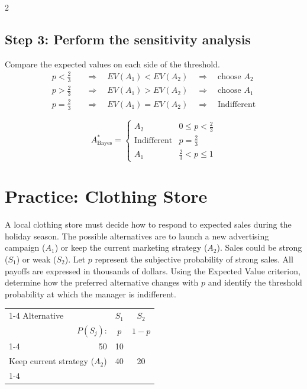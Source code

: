 \begin{multicols}{2}
	\subsection*{Step 3: Perform the sensitivity analysis}
	
	Compare the expected values on each side of the threshold.
	\[
	\begin{aligned}
		p<\frac{2}{3}
		&\quad\Rightarrow\quad
		EV(A_1)<EV(A_2)
		\quad\Rightarrow\quad
		\text{choose } A_2
		\\[2mm]
		p>\frac{2}{3}
		&\quad\Rightarrow\quad
		EV(A_1)>EV(A_2)
		\quad\Rightarrow\quad
		\text{choose } A_1
		\\[2mm]
		p=\frac{2}{3}
		&\quad\Rightarrow\quad
		EV(A_1)=EV(A_2)
		\quad\Rightarrow\quad
		\text{Indifferent}
	\end{aligned}
	\]
	
	\[
	\boxed{
		A^*_{\mathrm{Bayes}} =
		\begin{cases}
			A_2 & 0\leq p<\frac{2}{3}\\
			\text{Indifferent} & p=\frac{2}{3}\\
			A_1 & \frac{2}{3}<p\leq1
	\end{cases}}
	\]
	
	\section{Practice: Clothing Store}
	
	A local clothing store must decide how to respond to expected sales
	during the holiday season.
	The possible alternatives are to
	launch a new advertising campaign ($A_1$)
	or keep the current marketing strategy ($A_2$).	
	Sales could be strong ($S_1$) or weak ($S_2$).
	Let $p$ represent the subjective probability of strong sales.
	All payoffs are expressed in thousands of dollars.	
	Using the Expected Value criterion, determine how the preferred alternative changes with $p$ and identify the threshold probability at which the manager is indifferent.
	
	
	\vspace{-3mm}
	
	\begin{center}
		\renewcommand{\arraystretch}{1.3}
		\small
		\begin{tabular}{lr@{\qquad}cc}
			\cmidrule{1-4}
			Alternative & & $S_1$ & $S_2$ \\
			& $P(S_j)$: & $p$ & $1-p$ \\
			\cmidrule{1-4}
			\multicolumn{2}{l}{Launch new campaign ($A_1$)} & 50 & 10 \\
			\multicolumn{2}{l}{Keep current strategy ($A_2$)} & 40 & 20 \\
			\cmidrule{1-4}
		\end{tabular}
	\end{center}
	

\end{multicols}
